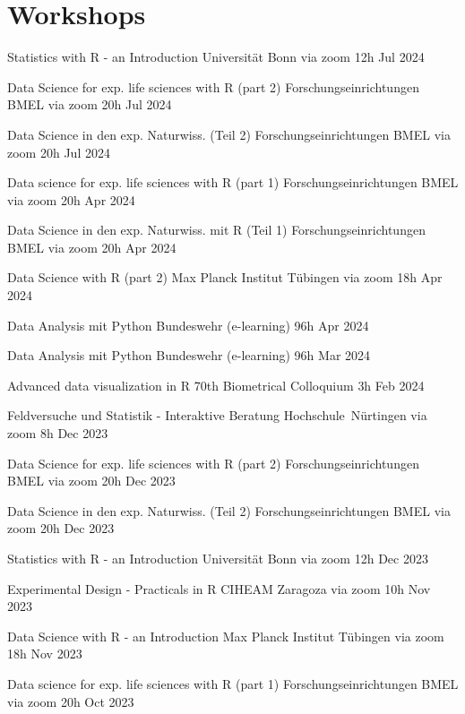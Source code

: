 \documentclass[11pt,a4paper,]{awesome-cv}
\begin{document}
\newpage

\hypertarget{workshops}{%
\section{Workshops}\label{workshops}}

\begin{cvhonors} 
\cvhonor
{Statistics with R - an Introduction  }
{Universität Bonn via zoom}
{12h}
{Jul 2024  }

\cvhonor
{Data Science for exp. life sciences with R (part 2)  }
{Forschungseinrichtungen BMEL via zoom}
{20h}
{Jul 2024  }

\cvhonor
{Data Science in den exp. Naturwiss. (Teil 2)  }
{Forschungseinrichtungen BMEL via zoom}
{20h}
{Jul 2024  }

\cvhonor
{Data science for exp. life sciences with R (part 1)  }
{Forschungseinrichtungen BMEL via zoom}
{20h}
{Apr 2024  }

\cvhonor
{Data Science in den exp. Naturwiss. mit R (Teil 1)  }
{Forschungseinrichtungen BMEL via zoom}
{20h}
{Apr 2024  }

\cvhonor
{Data Science with R (part 2)  }
{Max Planck Institut Tübingen via zoom}
{18h}
{Apr 2024  }

\cvhonor
{Data Analysis mit Python  }
{Bundeswehr (e-learning)}
{96h}
{Apr 2024  }

\cvhonor
{Data Analysis mit Python  }
{Bundeswehr (e-learning)}
{96h}
{Mar 2024  }

\cvhonor
{Advanced data visualization in R  }
{70th Biometrical Colloquium}
{3h}
{Feb 2024  }

\cvhonor
{Feldversuche und Statistik - Interaktive Beratung  }
{Hochschule Nürtingen via zoom}
{8h}
{Dec 2023  }

\cvhonor
{Data Science for exp. life sciences with R (part 2)  }
{Forschungseinrichtungen BMEL via zoom}
{20h}
{Dec 2023  }

\cvhonor
{Data Science in den exp. Naturwiss. (Teil 2)  }
{Forschungseinrichtungen BMEL via zoom}
{20h}
{Dec 2023  }

\cvhonor
{Statistics with R - an Introduction  }
{Universität Bonn via zoom}
{12h}
{Dec 2023  }

\cvhonor
{Experimental Design - Practicals in R  }
{CIHEAM Zaragoza via zoom}
{10h}
{Nov 2023  }

\cvhonor
{Data Science with R - an Introduction  }
{Max Planck Institut Tübingen via zoom}
{18h}
{Nov 2023  }

\cvhonor
{Data science for exp. life sciences with R (part 1)  }
{Forschungseinrichtungen BMEL via zoom}
{20h}
{Oct 2023  }


\end{cvhonors}
\end{document}
